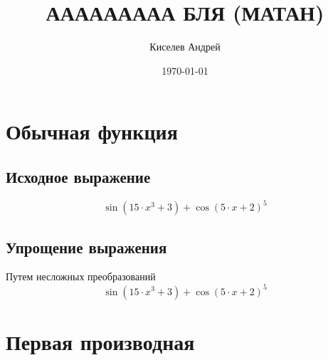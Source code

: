 \documentclass[12pt, a4paper]{report}
\title{ААААААААА БЛЯ (МАТАН)}
\author{Киселев Андрей}
\date{\today}
\begin{document}
\maketitle

\tableofcontents

\chapter{Обычная функция}
\section{Исходное выражение}
\begin{dmath*}
\sin{(15 \cdot  x  ^ {3} + 3)} + \cos{(5 \cdot  x  + 2)} ^ {5}\end{dmath*}
\section{Упрощение выражения}
Путем несложных преобразований
\begin{dmath*}
\sin{(15 \cdot  x  ^ {3} + 3)} + \cos{(5 \cdot  x  + 2)} ^ {5}\end{dmath*}
\chapter{Первая производная}
\end{document}
